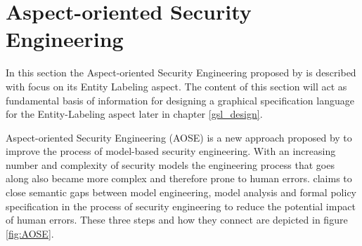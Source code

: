 \documentclass[twoside, openright, 12pt]{book}
\begin{document}







\section{Aspect-oriented Security Engineering}
\label{AOSE}
In this section the Aspect-oriented Security Engineering proposed by \cite{Amthor18} is described with focus on its Entity Labeling aspect.
The content of this section will act as fundamental basis of information for designing a graphical specification language for the Entity-Labeling aspect later in chapter \ref{gsl_design}.

Aspect-oriented Security Engineering (AOSE) is a new approach proposed by \cite{Amthor18} to improve the process of model-based security engineering.
With an increasing number and complexity of security models the engineering process that goes along also became more complex and therefore prone to human errors.
\cite{Amthor18} claims to close semantic gaps between model engineering, model analysis and formal policy specification in the process of security engineering to reduce the potential impact of human errors.
These three steps and how they connect are depicted in figure \ref{fig:AOSE}.
\end{document}
